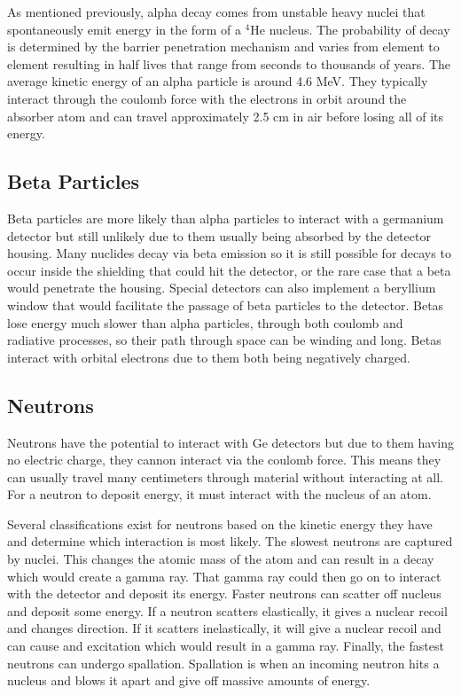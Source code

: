 As mentioned previously, alpha decay comes from unstable heavy nuclei that spontaneously emit energy in the form of a $^{4}$He nucleus.
The probability of decay is determined by the barrier penetration mechanism and varies from element to element resulting in half lives that range from seconds to thousands of years.
The average kinetic energy of an alpha particle is around 4.6 MeV.
They typically interact through the coulomb force with the electrons in orbit around the absorber atom and can travel approximately 2.5 cm in air before losing all of its energy.

\subsection{Beta Particles}
Beta particles are more likely than alpha particles to interact with a germanium detector but still unlikely due to them usually being absorbed by the detector housing.
Many nuclides decay via beta emission so it is still possible for decays to occur inside the shielding that could hit the detector, or the rare case that a beta would penetrate the housing.
Special detectors can also implement a beryllium window that would facilitate the passage of beta particles to the detector.
Betas lose energy much slower than alpha particles, through both coulomb and radiative processes, so their path through space can be winding and long.
Betas interact with orbital electrons due to them both being negatively charged.


\subsection{Neutrons}
Neutrons have the potential to interact with Ge detectors but due to them having no electric charge, they cannon interact via the coulomb force.
This means they can usually travel many centimeters through material without interacting at all.
For a neutron to deposit energy, it must interact with the nucleus of an atom.

Several classifications exist for neutrons based on the kinetic energy they have and determine which interaction is most likely.
The slowest neutrons are captured by nuclei.
This changes the atomic mass of the atom and can result in a decay which would create a gamma ray.
That gamma ray could then go on to interact with the detector and deposit its energy.
Faster neutrons can scatter off nucleus and deposit some energy.
If a neutron scatters elastically, it gives a nuclear recoil and changes direction.
If it scatters inelastically, it will give a nuclear recoil and can cause and excitation which would result in a gamma ray.
Finally, the fastest neutrons can undergo spallation.
Spallation is when an incoming neutron hits a nucleus and blows it apart and give off massive amounts of energy.

